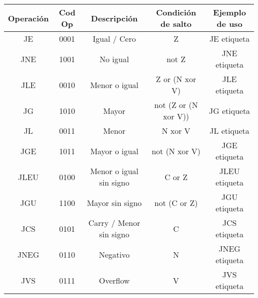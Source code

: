 \begin{threeparttable}
\begin{threeparttable}
\begin{table}[H]
  \begin{center}
    \begin{tabular}{| c | c | c | c | c |}
      \hline
      \textbf{Operación} & \textbf{Cod Op}         & \textbf{Descripción}    & \textbf{Condición de salto}   & \textbf{Ejemplo de uso} \\ \hline
      JE                 & 0001                    & Igual / Cero            & Z                             & JE etiqueta             \\ \hline
      JNE                & 1001                    & No igual                & not Z                         & JNE etiqueta            \\ \hline
      JLE                & 0010                    & Menor o igual           & Z or (N xor V)                & JLE etiqueta            \\ \hline
      JG                 & 1010                    & Mayor                   & not (Z or (N xor V))          & JG etiqueta             \\ \hline
      JL                 & 0011                    & Menor                   & N xor V                       & JL etiqueta             \\ \hline 
      JGE                & 1011                    & Mayor o igual           & not (N xor V)                 & JGE etiqueta            \\ \hline
      JLEU               & 0100                    & Menor o igual sin signo & C or Z                        & JLEU etiqueta           \\ \hline
      JGU                & 1100                    & Mayor sin signo         & not (C or Z)                  & JGU etiqueta            \\ \hline
      JCS                & 0101                    & Carry / Menor sin signo & C                             & JCS etiqueta            \\ \hline
      JNEG               & 0110                    & Negativo                & N                             & JNEG etiqueta           \\ \hline
      JVS                & 0111                    & Overflow                & V                             & JVS etiqueta            \\ \hline
    \end{tabular}
    \label{tab:saltos}
  \end{center}
\end{table}

\end{threeparttable}
\end{threeparttable}
